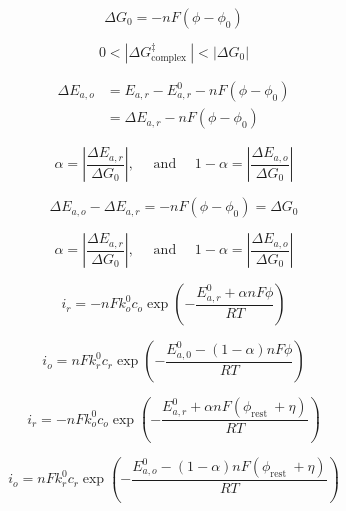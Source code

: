\documentclass[lettersize,journal]{IEEEtran}
\begin{document}
\begin{equation}
\Delta G_{0}=-n F\left(\phi-\phi_{0}\right)
\end{equation}

\begin{equation}
0<\left|\Delta G_{\text {complex }}^{\ddagger}\right|<\left|\Delta G_{0}\right|
\end{equation}

\begin{equation}
\begin{aligned}
\Delta E_{a, o} &=E_{a, r}-E_{a, r}^{0}-n F\left(\phi-\phi_{0}\right) \\
&=\Delta E_{a, r}-n F\left(\phi-\phi_{0}\right)
\end{aligned}
\end{equation}

\begin{equation}
\alpha=\left|\frac{\Delta E_{a, r}}{\Delta G_{0}}\right|, \quad \text { and } \quad 1-\alpha=\left|\frac{\Delta E_{a, o}}{\Delta G_{0}}\right|
\end{equation}

\begin{equation}
\Delta E_{a, o}-\Delta E_{a, r}=-n F\left(\phi-\phi_{0}\right)=\Delta G_{0}
\end{equation}

\begin{equation}
\alpha=\left|\frac{\Delta E_{a, r}}{\Delta G_{0}}\right|, \quad \text { and } \quad 1-\alpha=\left|\frac{\Delta E_{a, o}}{\Delta G_{0}}\right|
\end{equation}




\begin{equation}
i_{r}=-n F k_{o}^{0} c_{o} \exp \left(-\frac{E_{a, r}^{0}+\alpha n F \phi}{R T}\right)
\end{equation}

\begin{equation}
i_{o}=n F k_{r}^{0} c_{r} \exp \left(-\frac{E_{a, 0}^{0}-(1-\alpha) n F \phi}{R T}\right)
\end{equation}

\begin{equation}
i_{r}=-n F k_{o}^{0} c_{o} \exp \left(-\frac{E_{a, r}^{0}+\alpha n F\left(\phi_{\text {rest }}+\eta\right)}{R T}\right)
\end{equation}

\begin{equation}
i_{o}=n F k_{r}^{0} c_{r} \exp \left(-\frac{E_{a, o}^{0}-(1-\alpha) n F\left(\phi_{\text {rest }}+\eta\right)}{R T}\right)
\end{equation}
\end{document}
